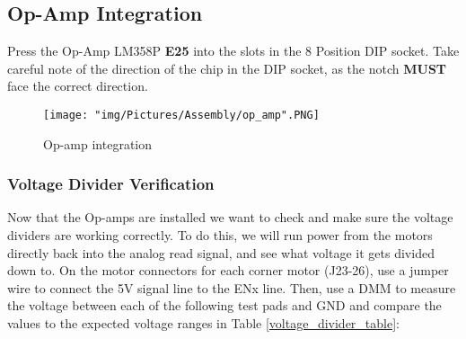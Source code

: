 \documentclass[12pt]{article}
\begin{document}
\subsection{Op-Amp Integration}

Press the Op-Amp LM358P \textbf{E25} into the slots in the 8 Position DIP socket. Take careful note of the direction of the chip in the DIP socket, as the notch \textbf{MUST} face the correct direction.

\begin{figure}[H]
  \centering
    \texttt{[image: "img/Pictures/Assembly/op\_amp".PNG]}
  \caption{Op-amp integration}
\end{figure}

\subsubsection{Voltage Divider Verification}

Now that the Op-amps are installed we want to check and make sure the voltage dividers are working correctly. To do this, we will run power from the motors directly back into the analog read signal, and see what voltage it gets divided down to. On the motor connectors for each corner motor (J23-26), use a jumper wire to connect the 5V signal line to the ENx line. Then, use a DMM to measure the voltage between each of the following test pads and GND and compare the values to the expected voltage ranges in Table \ref{voltage_divider_table}:
\end{document}
